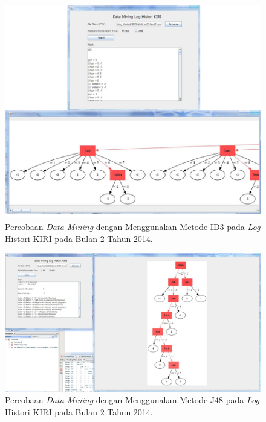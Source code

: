 \begin{figure}[H]
\centering
\includegraphics[scale=0.5]{Gambar/percobaan1.jpg}
\caption[Percobaan \textsl{Data Mining} dengan Menggunakan Metode ID3 pada \textsl{Log} Histori KIRI pada Bulan 2 Tahun 2014]{Percobaan \textsl{Data Mining} dengan Menggunakan Metode ID3 pada \textsl{Log} Histori KIRI pada Bulan 2 Tahun 2014.} 
\label{fig:percobaan1}
\end{figure}

\begin{figure}[H]
\centering
\includegraphics[scale=0.3]{Gambar/percobaan2.jpg}
\caption[Percobaan \textsl{Data Mining} dengan Menggunakan Metode J48 pada \textsl{Log} Histori KIRI pada Bulan 2 Tahun 2014]{Percobaan \textsl{Data Mining} dengan Menggunakan Metode J48 pada \textsl{Log} Histori KIRI pada Bulan 2 Tahun 2014.} 
\label{fig:percobaan2}
\end{figure}

